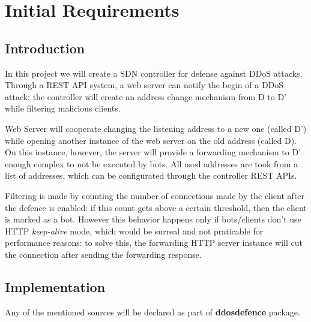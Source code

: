 \chapter{Initial Requirements}

\section{Introduction}
In this project we will create a SDN controller for defense against DDoS attacks. Through a REST API system, a web server can notify the begin of a DDoS attack: the controller will create an address change mechanism from D to D’ while filtering malicious clients.

Web Server will cooperate changing the listening address to a new one (called D') while opening another instance of the web server on the old address (called D). On this instance, however, the server will provide a forwarding mechanism to D' enough complex to not be executed by bots.
All used addresses are took from a list of addresses, which can be configurated through the controller REST APIs.

Filtering is made by counting the number of connections made by the client after the defence is enabled: if this count gets above a certain threshold, then the client is marked as a bot. However this behavior happens only if bots/clients don't use HTTP \textit{keep-alive} mode, which would be surreal and not praticable for performance reasons: to solve this, the forwarding HTTP server instance will cut the connection after sending the forwarding response.

\section{Implementation}
Any of the mentioned sources will be declared as part of \textbf{ddosdefence} package.

